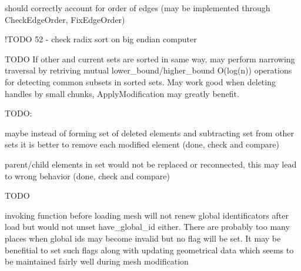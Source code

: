 \begin{DoxyRefList}
\begin{DoxyEnumerate}
\item should correctly account for order of edges (may be implemented through Check\-Edge\-Order, Fix\-Edge\-Order)  
\end{DoxyEnumerate}
\item[\label{todo__todo000003}%
\hypertarget{todo__todo000003}{}%
Member \hyperlink{classINMOST_1_1ElementSet_a96676712005ce12f0c1f9a92c6ac095d}{I\-N\-M\-O\-S\-T\-:\-:Element\-Set\-:\-:Sort\-Set} (Comparator\-Type comp) const ]!\-T\-O\-D\-O 52 -\/ check radix sort on big endian computer  
\item[\label{todo__todo000002}%
\hypertarget{todo__todo000002}{}%
Member \hyperlink{classINMOST_1_1ElementSet_a1aafea0ac742bcc3ec1873621ca41ccd}{I\-N\-M\-O\-S\-T\-:\-:Element\-Set\-:\-:Subtract} (const Element\-Set \&other) const ]T\-O\-D\-O If other and current sets are sorted in same way, may perform narrowing traversal by retriving mutual lower\-\_\-bound/higher\-\_\-bound O(log(n)) operations for detecting common subsets in sorted sets. May work good when deleting handles by small chunks, Apply\-Modification may greatly benefit.  
\item[\label{todo__todo000011}%
\hypertarget{todo__todo000011}{}%
Member \hyperlink{classINMOST_1_1Mesh_a1f53070855f3503b2f4cefc16cedd6a0}{I\-N\-M\-O\-S\-T\-:\-:Mesh\-:\-:Apply\-Modification} ()]T\-O\-D\-O\-:
\begin{DoxyEnumerate}
\item maybe instead of forming set of deleted elements and subtracting set from other sets it is better to remove each modified element (done, check and compare)
\item parent/child elements in set would not be replaced or reconnected, this may lead to wrong behavior (done, check and compare)  
\end{DoxyEnumerate}
\item[\label{todo__todo000005}%
\hypertarget{todo__todo000005}{}%
Member \hyperlink{classINMOST_1_1Mesh_ae39e30b11f35de81d2a9b8451ef87391}{I\-N\-M\-O\-S\-T\-:\-:Mesh\-:\-:Assign\-Global\-I\-D} (Element\-Type mask)]T\-O\-D\-O
\begin{DoxyEnumerate}
\item invoking function before loading mesh will not renew global identificators after load but would not unset have\-\_\-global\-\_\-id either. There are probably too many places when global ids may become invalid but no flag will be set. It may be benefitial to set such flags along with updating geometrical data which seems to be maintained fairly well during mesh modification  

\end{DoxyEnumerate}
\end{DoxyRefList}

